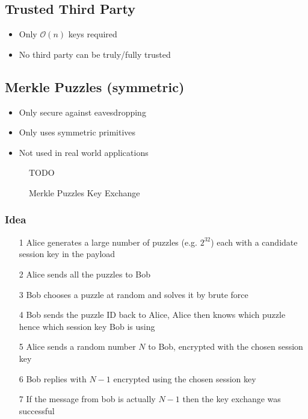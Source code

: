 \documentclass[a4paper]{article}
\begin{document}
\subsection{Trusted Third Party}

\begin{itemize}
  \item Only $\mathcal{O}(n)$ keys required
  \item No third party can be truly/fully trusted
\end{itemize}

\subsection{Merkle Puzzles (symmetric)}

\begin{itemize}
  \item Only secure against eavesdropping
  \item Only uses symmetric primitives
  \item Not used in real world applications
\end{itemize}

\begin{figure}[h!]
  \centering
  TODO
  \caption{Merkle Puzzles Key Exchange}
  \label{fig:merkle_puzzles_key_exchange}
\end{figure}
\FloatBarrier

\subsubsection{Idea}

\begin{enumerate}
  \item[1] Alice generates a large number of puzzles (e.g. $2^{32}$) each with a
           candidate session key in the payload
  \item[2] Alice sends all the puzzles to Bob
  \item[3] Bob chooses a puzzle at random and solves it by brute force
  \item[4] Bob sends the puzzle ID back to Alice, Alice then knows which puzzle
           hence which session key Bob is using
  \item[5] Alice sends a random number $N$ to Bob, encrypted with the
           chosen session key
  \item[6] Bob replies with $N-1$ encrypted using the chosen session key
  \item[7] If the message from bob is actually $N-1$ then the key exchange was
           successful
\end{enumerate}
\end{document}
